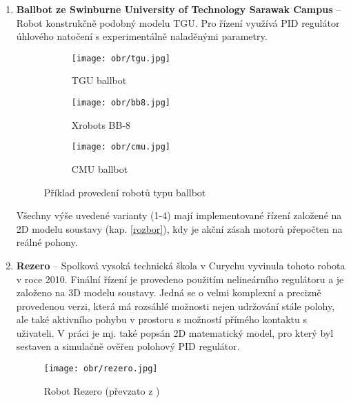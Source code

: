 \begin{enumerate}
\item \textbf{Ballbot ze Swinburne University of Technology Sarawak Campus} \cite{kuala} -- Robot konstrukčně podobný modelu TGU. Pro řízení využívá PID regulátor úhlového natočení s experimentálně naladěnými parametry. 
\vspace{5mm}
\begin{figure}[h]
\begin{center}
\begin{subfigure}{0.3\textwidth}
\centering
\texttt{[image: obr/tgu.jpg]}
\caption{TGU ballbot \cite{tgu}}
\end{subfigure}
\hspace{5mm}
\begin{subfigure}{0.3\textwidth}
\centering
\texttt{[image: obr/bb8.jpg]}
\caption{Xrobots BB-8 \cite{bb8}}
\end{subfigure}
\hspace{5mm}
\begin{subfigure}{0.3\textwidth}
\centering
\texttt{[image: obr/cmu.jpg]}
\caption{CMU ballbot \cite{obr_cmu}}
\end{subfigure}
\end{center}
\caption{Příklad provedení robotů typu ballbot}
\end{figure}    

Všechny výše uvedené varianty (1-4) mají implementované řízení založené na 2D modelu soustavy (kap. \ref{rozbor}), kdy je akční zásah motorů přepočten na reálné pohony.

\newpage

\item \textbf{Rezero} -- Spolková vysoká technická škola v Curychu vyvinula tohoto robota \cite{rezero} v roce 2010. Finální řízení je provedeno použitím nelineárního regulátoru a je založeno na 3D modelu soustavy. Jedná se o velmi komplexní a precizně provedenou verzi, která má rozsáhlé možnosti nejen udržování stále polohy, ale také aktivního pohybu v prostoru s možností přímého kontaktu s uživateli. V práci je mj. také popsán 2D matematický model, pro který byl sestaven a simulačně ověřen polohový PID regulátor.
\vspace{5mm}
\begin{figure}[htb]
\begin{center}
\texttt{[image: obr/rezero.jpg]}
\end{center}
\vspace{5mm}
\caption{Robot Rezero (převzato z \cite{rezero})}
\label{cocka}
\end{figure}

\end{enumerate}


